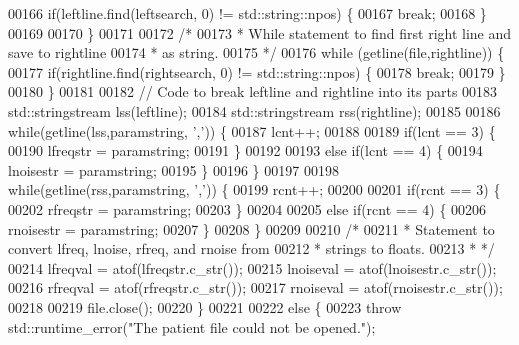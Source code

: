 \begin{DoxyCode}
00166                 \textcolor{keywordflow}{if}(leftline.find(leftsearch, 0) != std::string::npos) \{
00167                     \textcolor{keywordflow}{break};
00168                 \}
00169 
00170             \}
00171 
00172             \textcolor{comment}{/*}
00173 \textcolor{comment}{             * While statement to find first right line and save to rightline}
00174 \textcolor{comment}{             * as string.}
00175 \textcolor{comment}{             */}
00176             \textcolor{keywordflow}{while} (getline(file,rightline)) \{
00177                 \textcolor{keywordflow}{if}(rightline.find(rightsearch, 0) != std::string::npos) \{
00178                     \textcolor{keywordflow}{break};
00179                 \}
00180             \}
00181 
00182             \textcolor{comment}{// Code to break leftline and rightline into its parts}
00183             std::stringstream lss(leftline);
00184             std::stringstream rss(rightline);
00185 
00186             \textcolor{keywordflow}{while}(getline(lss,paramstring, \textcolor{charliteral}{','})) \{
00187                 lcnt++;
00188 
00189                 \textcolor{keywordflow}{if}(lcnt == 3) \{
00190                     lfreqstr = paramstring;
00191                 \}
00192 
00193                 \textcolor{keywordflow}{else} \textcolor{keywordflow}{if}(lcnt == 4) \{
00194                     lnoisestr = paramstring;
00195                 \}
00196             \}
00197 
00198             \textcolor{keywordflow}{while}(getline(rss,paramstring, \textcolor{charliteral}{','})) \{
00199                 rcnt++;
00200 
00201                 \textcolor{keywordflow}{if}(rcnt == 3) \{
00202                     rfreqstr = paramstring;
00203                 \}
00204 
00205                 \textcolor{keywordflow}{else} \textcolor{keywordflow}{if}(rcnt == 4) \{
00206                     rnoisestr = paramstring;
00207                 \}
00208             \}
00209 
00210             \textcolor{comment}{/*}
00211 \textcolor{comment}{             * Statement to convert lfreq, lnoise, rfreq, and rnoise from}
00212 \textcolor{comment}{             * strings to floats.}
00213 \textcolor{comment}{             * */}
00214             lfreqval = atof(lfreqstr.c\_str());
00215             lnoiseval = atof(lnoisestr.c\_str());
00216             rfreqval = atof(rfreqstr.c\_str());
00217             rnoiseval = atof(rnoisestr.c\_str());
00218 
00219             file.close();
00220         \}
00221 
00222         \textcolor{keywordflow}{else} \{
00223             \textcolor{keywordflow}{throw} std::runtime\_error(\textcolor{stringliteral}{"The patient file could not be opened."});

\end{DoxyCode}
